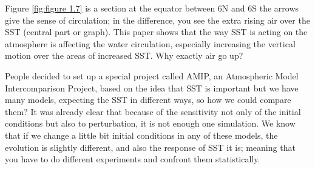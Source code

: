 Figure \ref{fig:figure 1.7} is a section at the equator between 6N and 6S 
the arrows give the sense of circulation; in the difference, you see the extra rising air over the SST (central part or graph). This paper shows that the way SST is acting on the atmosphere is affecting the water circulation, especially increasing the vertical motion over the areas of increased SST. Why exactly air go up?

People decided to set up a special project called AMIP, an Atmospheric Model Intercomparison Project, based on the idea that SST is important but we have many models, expecting the SST in different ways, so how we could compare them? 
It was already clear that because of the sensitivity not only of the initial conditions but also to perturbation, it is not enough one simulation. 
We know that if we change a little bit initial conditions in any of these models, the evolution is slightly different, and also the response of SST it is; meaning that you have to do different experiments and confront them statistically. 

